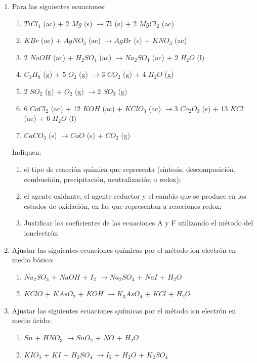 \documentclass[../Práctica.root.tex]{subfiles}
\newcommand{\lra}{\ensuremath{\longrightarrow{}}}
\begin{document}
\begin{enumerate}
    \item Para las siguientes ecuaciones:
          \begin{enumerate}
              \item $TiCl_4$ (ac) + 2 $Mg$ (s) \lra $Ti$ (s) + 2 $MgCl_2$ (ac)
              \item $KBr$ (ac) + $AgNO_3$ (ac) \lra $AgBr$ (s) + $KNO_3$ (ac)
              \item 2 $NaOH$ (ac) + $H_2SO_4$ (ac) \lra $Na_2SO_4$ (ac) + 2 $H_2O$ (l)
              \item $C_3H_8$ (g) + 5 $O_2$ (g) \lra 3 $CO_2$ (g) + 4 $H_2O$ (g)
              \item 2 $SO_2$ (g) + $O_2$ (g) \lra 2 $SO_3$ (g)
              \item 6 $CoCl_2$ (ac) + 12 $KOH$ (ac) + $KClO_3$ (ac) \lra 3 $Co_2O_3$ (s) + 13 $KCl$ (ac) + 6 $H_2O$ (l)
              \item $CaCO_3$ (s) \lra $CaO$ (s) + $CO_2$ (g)
          \end{enumerate}
          Indiquen:
          \begin{enumerate}
              \item el tipo de reacción química que representa (síntesis, descomposición, combustión,
                    precipitación, neutralización o redox);
              \item el agente oxidante, el agente reductor y el cambio que se produce en los estados de
                    oxidación, en las que representan a reacciones redox;
              \item Justificar los coeficientes de las ecuaciones A y F utilizando el método del ionelectrón
          \end{enumerate}

    \item Ajustar las siguientes ecuaciones químicas por el método ion electrón en medio básico:
          \begin{enumerate}
              \item $Na_2SO_3$ + $NaOH$ + $I_2$ \lra $Na_2SO_4$ + $NaI$ + $H_2O$
              \item $KClO$ + $KAsO_2$ + $KOH$ \lra $K_3AsO_4$ + $KCl$ + $H_2O$
          \end{enumerate}

    \item Ajustar las siguientes ecuaciones químicas por el método ion electrón en medio ácido:
          \begin{enumerate}
              \item $Sn$ + $HNO_3$ \lra $SnO_2$ + $NO$ + $H_2O$
              \item $KIO_3$ + $KI$ + $H_2SO_4$ \lra $I_2$ + $H_2O$ + $K_2SO_4$
          \end{enumerate}


\end{enumerate}
\end{document}
